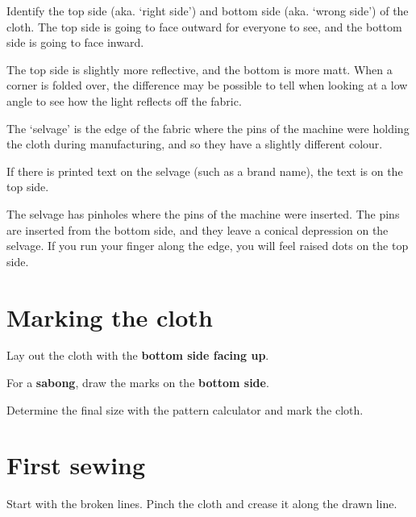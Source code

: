 \begin{multicols}{2}


\columnbreak

\setlength{\nextPhotoWidth}{0.5\textwidth}


\end{multicols}
\setlength{\nextPhotoWidth}{\defaultPhotoWidth}

Identify the top side (aka. `right side') and bottom side (aka. `wrong
side') of the cloth. The top side is going to face outward for everyone
to see, and the bottom side is going to face inward.

The top side is slightly more reflective, and the bottom is more matt.
When a corner is folded over, the difference may be possible to tell
when looking at a low angle to see how the light reflects off the
fabric.

The `selvage' is the edge of the fabric where the pins of the machine
were holding the cloth during manufacturing, and so they have a slightly
different colour.

If there is printed text on the selvage (such as a brand name), the text
is on the top side.

The selvage has pinholes where the pins of the machine were inserted.
The pins are inserted from the bottom side, and they leave a conical
depression on the selvage. If you run your finger along the edge, you
will feel raised dots on the top side.

\section{Marking the cloth}

Lay out the cloth with the \textbf{bottom side facing up}.

For a \textbf{sabong}, draw the marks on the \textbf{bottom side}.

Determine the final size with the pattern calculator and mark the cloth.

\clearpage

\section{First sewing}

Start with the broken lines. Pinch the cloth and crease it along the
drawn line.

